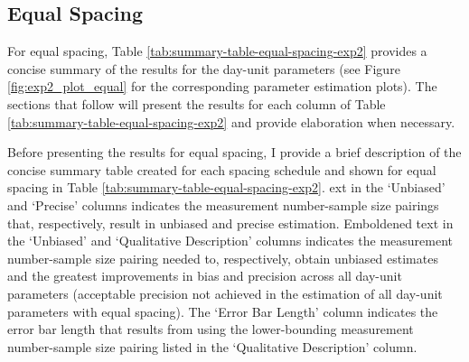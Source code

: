 \documentclass[
12pt, %
twoside,
english]{guelphthesis}
\theoremstyle{definition}
\theoremstyle{definition}
\theoremstyle{definition}
\theoremstyle{definition}
\theoremstyle{remark}
\begin{document}
\hypertarget{concise-example}{%
\subsection{Equal Spacing}\label{concise-example}}

For equal spacing, Table \ref{tab:summary-table-equal-spacing-exp2} provides a concise summary of the results for the day-unit parameters (see Figure \ref{fig:exp2_plot_equal} for the corresponding parameter estimation plots). The sections that follow will present the results for each column of Table \ref{tab:summary-table-equal-spacing-exp2} and provide elaboration when necessary.

Before presenting the results for equal spacing, I provide a brief description of the concise summary table created for each spacing schedule and shown for equal spacing in Table \ref{tab:summary-table-equal-spacing-exp2}. ext in the `Unbiased' and `Precise' columns indicates the measurement number-sample size pairings that, respectively, result in unbiased and precise estimation. Emboldened text in the `Unbiased' and `Qualitative Description' columns indicates the measurement number-sample size pairing needed to, respectively, obtain unbiased estimates and the greatest improvements in bias and precision across all day-unit parameters (acceptable precision not achieved in the estimation of all day-unit parameters with equal spacing). The `Error Bar Length' column indicates the error bar length that results from using the lower-bounding measurement number-sample size pairing listed in the `Qualitative Description' column.
\end{document}
